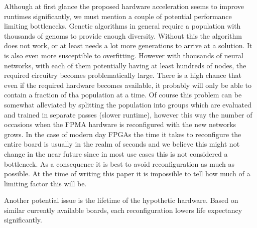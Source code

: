 \documentclass[lettersize,journal]{IEEEtran}
\begin{document}
		Although at first glance the proposed hardware acceleration seems to improve runtimes significantly, we must mention a couple of potential performance limiting bottlenecks. Genetic algorithms in general require a population with thousands of genoms to provide enough diversity. Without this the algorithm does not work, or at least needs a lot more generations to arrive at a solution. It is also even more susceptible to overfitting. However with thousands of neural networks, with each of them potentially having at least hundreds of nodes, the required circuitry becomes problematically large. There is a high chance that even if the required hardware becomes available, it probably will only be able to contain a fraction of tha population at a time. Of course this problem can be somewhat alleviated by splitting the population into groups which are evaluated and trained in separate passes (slower runtime), however this way the number of occasions when the FPMA hardware is reconfigured with the new networks grows. In the case of modern day FPGAs the time it takes to reconfigure the entire board is usually in the realm of seconds and we believe this might not change in the near future since in most use cases this is not considered a bottleneck. As a consequence it is best to avoid reconfiguration as much as possible. At the time of writing this paper it is impossible to tell how much of a limiting factor this will be.
		
		Another potential issue is the lifetime of the hypothetic hardware. Based on similar currently available boards, each reconfiguration lowers life expectancy significantly. %
		
\end{document}
